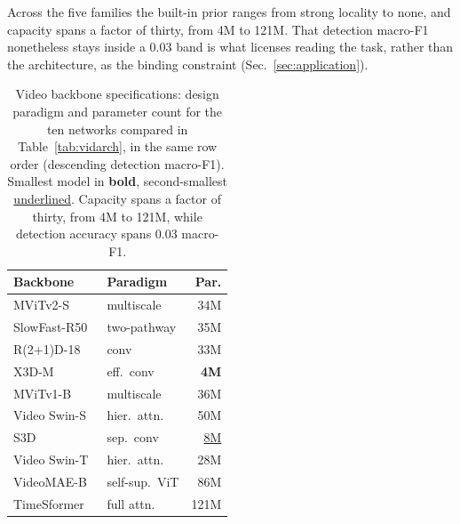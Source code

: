 Across the five families the built-in prior ranges from strong locality to none, and
capacity spans a factor of thirty, from 4M to 121M. That detection macro-F1
nonetheless stays inside a 0.03 band is what licenses reading the task, rather than
the architecture, as the binding constraint (Sec.~\ref{sec:application}).

\begin{table}[!ht]
\centering
\caption{Video backbone specifications: design paradigm and parameter count for the
ten networks compared in Table~\ref{tab:vidarch}, in the same row order (descending
detection macro-F1). Smallest model in \textbf{bold}, second-smallest
\underline{underlined}. Capacity spans a factor of thirty, from 4M to 121M, while
detection accuracy spans 0.03 macro-F1.}
\label{tab:vidspec}
\setlength{\tabcolsep}{7pt}
\renewcommand{\arraystretch}{1.12}
\begin{tabular}{@{}l l r@{}}
\toprule
\textbf{Backbone} & \textbf{Paradigm} & \textbf{Par.} \\
\midrule
MViTv2-S~\cite{li2022mvitv2} & multiscale & 34M \\
SlowFast-R50~\cite{feichtenhofer2019slowfast} & two-pathway & 35M \\
R(2+1)D-18~\cite{tran2018r2plus1d} & conv & 33M \\
X3D-M~\cite{feichtenhofer2020x3d} & eff.\ conv & \textbf{4M} \\
MViTv1-B~\cite{fan2021mvit} & multiscale & 36M \\
Video Swin-S~\cite{liu2022videoswin} & hier.\ attn. & 50M \\
S3D~\cite{xie2018s3d} & sep.\ conv & \underline{8M} \\
Video Swin-T~\cite{liu2022videoswin} & hier.\ attn. & 28M \\
VideoMAE-B~\cite{tong2022videomae} & self-sup.\ ViT & 86M \\
TimeSformer~\cite{bertasius2021timesformer} & full attn. & 121M \\
\bottomrule
\end{tabular}
\end{table}

